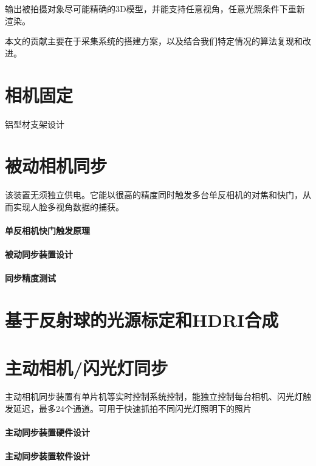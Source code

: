 \documentclass{scutmaster}
\begin{document}
输出被拍摄对象尽可能精确的3D模型，并能支持任意视角，任意光照条件下重新渲染。

本文的贡献主要在于采集系统的搭建方案，以及结合我们特定情况的算法复现和改进。

\section{相机固定}

铝型材支架设计

\section{被动相机同步}
\label{sec:passive_sync}

该装置无须独立供电。它能以很高的精度同时触发多台单反相机的对焦和快门，从而实现人脸多视角数据的捕获。

\paragraph{单反相机快门触发原理}

\paragraph{被动同步装置设计}

\paragraph{同步精度测试}



\section{基于反射球的光源标定和HDRI合成}

\section{主动相机/闪光灯同步}

主动相机同步装置有单片机等实时控制系统控制，能独立控制每台相机、闪光灯触发延迟，最多24个通道。可用于快速抓拍不同闪光灯照明下的照片

\paragraph{主动同步装置硬件设计}

\paragraph{主动同步装置软件设计}
\end{document}
